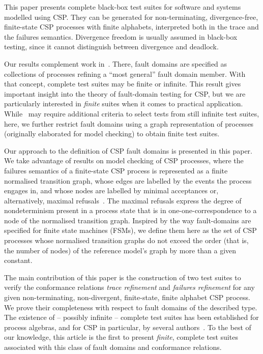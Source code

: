 This paper presents complete black-box test suites for software and systems
modelled using CSP. They can be generated for non-terminating,
divergence-free, finite-state CSP processes with finite alphabets,
interpreted both in the trace and the failures semantics. Divergence freedom
is usually assumed in black-box testing, since it cannot distinguish between
divergence and deadlock.

Our results complement work in~\cite{DBLP:conf/pts/CavalcantiS17}. There,
fault domains are specified as collections of processes refining a ``most
general'' fault domain member. With that concept, complete test suites may be
finite or infinite. This result gives important insight into the theory of
fault-domain testing for CSP, but we are particularly interested in {\it
finite} suites when it comes to practical application.
While~\cite{DBLP:conf/pts/CavalcantiS17} may require additional criteria to
select tests from still infinite test suites, here, we further restrict fault
domains using a graph representation of processes (originally elaborated for
model checking) to obtain finite test suites.

Our approach to the definition of CSP fault domains is presented in this
paper. We take advantage of results on model checking of CSP
processes, where the failures semantics of a finite-state CSP process is
represented as a finite normalised transition graph, whose edges are labelled
by the events the process engages in, and whose nodes are labelled by minimal
acceptances or, alternatively, maximal
refusals~\cite{Roscoe:1994:chapter}. The maximal refusals express the
degree of nondeterminism present in a process state that is in
one-one-correspondence to a node of the normalised transition graph. Inspired
by the way fault-domains are specified for finite state machines (FSMs),
we define them here as the set of CSP processes whose normalised transition
graphs do not exceed the order (that is, the number of nodes) of the
reference model's graph by more than a given constant.

The main contribution of this paper is the construction of two test suites to
verify the conformance relations \emph{trace refinement} and \emph{failures
refinement} for any given non-terminating, non-divergent, finite-state,
finite alphabet CSP process. We prove their completeness with respect to
fault domains of the described type.  The existence of -- possibly infinite
-- complete test suites has been established for process algebras, and for
CSP in particular, by several
authors~\cite{Hennessy:1988:ATP:50497,Schneider:1995:OST:203471.203475,DBLP:conf/fm/PeleskaS96,peleska1997a,DBLP:conf/icfem/CavalcantiG07,DBLP:conf/pts/CavalcantiS17}.
To the best of our knowledge, this article is the first to present {\it
finite}, complete test suites associated with this class of fault domains and
conformance relations.

